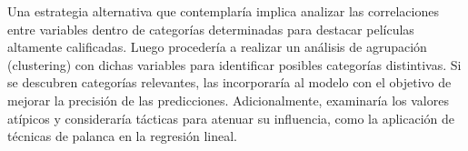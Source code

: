 \documentclass[
]{article}
\begin{document}
Una estrategia alternativa que contemplaría implica analizar las
correlaciones entre variables dentro de categorías determinadas para
destacar películas altamente calificadas. Luego procedería a realizar un
análisis de agrupación (clustering) con dichas variables para
identificar posibles categorías distintivas. Si se descubren categorías
relevantes, las incorporaría al modelo con el objetivo de mejorar la
precisión de las predicciones. Adicionalmente, examinaría los valores
atípicos y consideraría tácticas para atenuar su influencia, como la
aplicación de técnicas de palanca en la regresión lineal.
\end{document}
